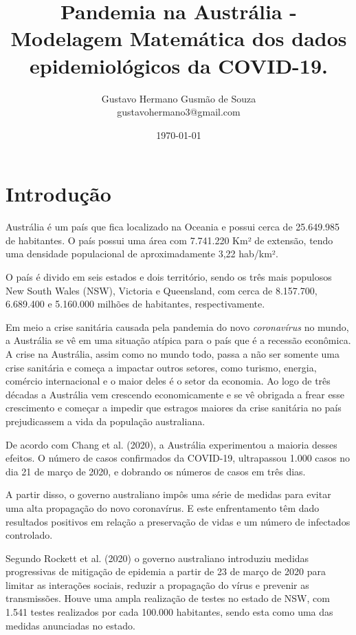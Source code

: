 \documentclass{article}
\title{Pandemia na Austrália - Modelagem Matemática dos dados epidemiológicos da COVID-19.}
\author{Gustavo Hermano Gusmão de Souza \\ gustavohermano3@gmail.com}
\date{\today}
\begin{document}
\maketitle
\section{Introdução}

\label{intro}

Austrália é um país que fica localizado na Oceania e possui cerca de 25.649.985  de habitantes. O país possui uma área com  7.741.220 Km² de extensão, tendo uma densidade populacional de aproximadamente 3,22 hab/km².

O país é divido em seis estados e dois território, sendo os três mais populosos New South Wales (NSW), Victoria e Queensland, com cerca de 8.157.700, 6.689.400 e 5.160.000 milhões de habitantes, respectivamente.   

Em meio a crise sanitária causada pela pandemia do novo \textit{coronavírus} no mundo, a Austrália se vê em uma situação atípica para o país que é a recessão econômica. A crise na Austrália, assim como no mundo todo, passa a não ser somente uma crise sanitária e começa a impactar outros setores, como turismo, energia, comércio internacional e o maior deles é o setor da economia. Ao logo de três décadas a Austrália vem crescendo economicamente e se vê obrigada a frear esse crescimento e começar a impedir que estragos maiores da crise sanitária no país prejudicassem a vida da população australiana. 

De acordo com Chang et al. (2020), a Austrália experimentou a maioria desses efeitos. O número de casos confirmados da COVID-19, ultrapassou 1.000 casos no dia 21 de março de 2020, e dobrando os números de casos em três dias. 

A partir disso, o governo australiano impôs uma série de medidas para evitar uma alta propagação do novo coronavírus. E este enfrentamento têm dado resultados positivos em relação a preservação de vidas e um número de infectados controlado.

Segundo Rockett et al. (2020) o governo australiano introduziu medidas progressivas de mitigação de epidemia a partir de 23 de março de 2020 para limitar as interações sociais, reduzir a propagação do vírus e prevenir as transmissões. Houve uma ampla realização de testes no estado de  NSW, com 1.541 testes realizados por cada 100.000 habitantes, sendo esta como uma das medidas anunciadas no estado.
\end{document}
